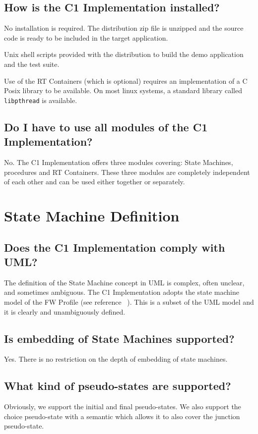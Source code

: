 \documentclass[a4paper,10pt]{article}
\let\stdsection\section
\renewcommand\section{\newpage\stdsection}
\begin{document}
\subsection{How is the C1 Implementation installed?}
No installation is required. The distribution zip file is unzipped and the source code is ready to be included in the target application. 

Unix shell scripts provided with the distribution to build the demo application and the test suite.

Use of the RT Containers (which is optional) requires an implementation of a C Posix library to be available. On most linux systems, a standard library called \texttt{libpthread} is available.  

\subsection{Do I have to use all modules of the C1 Implementation?}
No. The C1 Implementation offers three modules covering: State Machines, procedures and RT Containers. These three modules are completely independent of each other and can be used either together or separately.

\section{State Machine Definition}

\subsection{Does the C1 Implementation comply with UML?}
The definition of the State Machine concept in UML is complex, often unclear, and sometimes ambiguous. The C1 Implementation adopts the state machine model 
of the FW Profile (see reference ~\cite{ref:fwprofile}). This is a subset of the UML model and it is clearly and unambiguously defined. 

\subsection{Is embedding of State Machines supported?}
Yes. There is no restriction on the depth of embedding of state machines.

\subsection{What kind of pseudo-states are supported?}
Obviously, we support the initial and final pseudo-states. We also support the choice pseudo-state with a semantic which allows it to also cover the 
junction pseudo-state. 
\end{document}
